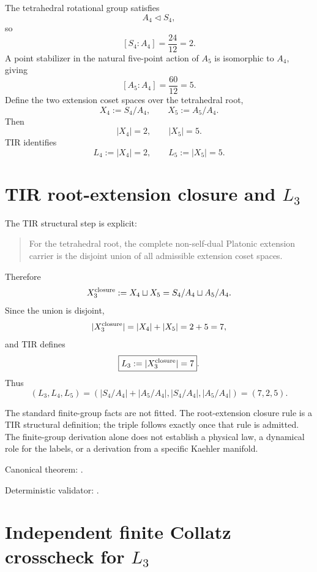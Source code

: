 The tetrahedral rotational group satisfies
\[
A_4\triangleleft S_4,
\]
so
\[
\boxed{[S_4:A_4]=\frac{24}{12}=2}.
\]
A point stabilizer in the natural five-point action of \(A_5\) is isomorphic to
\(A_4\), giving
\[
\boxed{[A_5:A_4]=\frac{60}{12}=5}.
\]
Define the two extension coset spaces over the tetrahedral root,
\[
X_4:=S_4/A_4,
\qquad
X_5:=A_5/A_4.
\]
Then
\[
|X_4|=2,
\qquad
|X_5|=5.
\]
TIR identifies
\[
\boxed{L_4:=|X_4|=2},
\qquad
\boxed{L_5:=|X_5|=5}.
\]

\section[TIR root-extension closure and L3]{TIR root-extension closure and $L_3$}

The TIR structural step is explicit:

\begin{quote}
For the tetrahedral root, the complete non-self-dual Platonic extension carrier
is the disjoint union of all admissible extension coset spaces.
\end{quote}

Therefore
\[
X_3^{\rm closure}:=X_4\sqcup X_5
=S_4/A_4\sqcup A_5/A_4.
\]
Since the union is disjoint,
\[
|X_3^{\rm closure}|=|X_4|+|X_5|=2+5=7,
\]
and TIR defines
\[
\boxed{L_3:=|X_3^{\rm closure}|=7}.
\]
Thus
\[
\boxed{
(L_3,L_4,L_5)
=\left(
|S_4/A_4|+|A_5/A_4|,
|S_4/A_4|,
|A_5/A_4|
\right)
=(7,2,5).
}
\]

The standard finite-group facts are not fitted.  The root-extension closure
rule is a TIR structural definition; the triple follows exactly once that rule
is admitted.  The finite-group derivation alone does not establish a physical
law, a dynamical role for the labels, or a derivation from a specific Kaehler
manifold.

Canonical theorem:
.

Deterministic validator:
.

\section[Independent finite Collatz crosscheck for L3]{Independent finite Collatz crosscheck for $L_3$}

